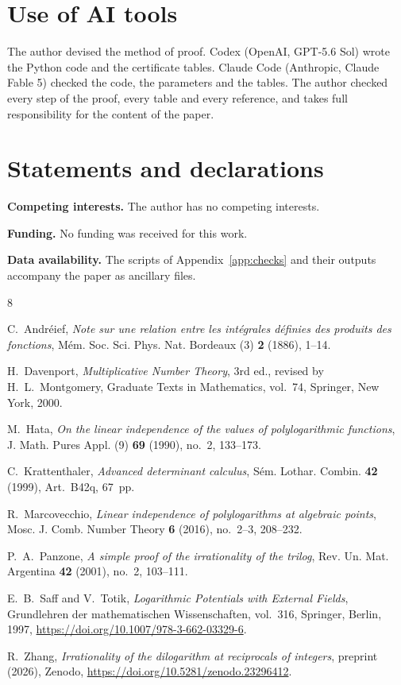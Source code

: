 \documentclass{amsart}
\numberwithin{equation}{section}
\numberwithin{table}{section}
\begin{document}
\section*{Use of AI tools}

The author devised the method of proof. Codex (OpenAI, GPT-5.6 Sol) wrote
the Python code and the certificate tables. Claude Code (Anthropic, Claude
Fable 5) checked the code, the parameters and the tables. The author checked
every step of the proof, every table and every reference, and takes full
responsibility for the content of the paper.

\section*{Statements and declarations}

\textbf{Competing interests.} The author has no competing interests.

\textbf{Funding.} No funding was received for this work.

\textbf{Data availability.} The scripts of Appendix~\ref{app:checks} and their
outputs accompany the paper as ancillary files.

\begin{thebibliography}{8}

C.~Andr\'eief, \emph{Note sur une relation entre les int\'egrales d\'efinies
des produits des fonctions}, M\'em. Soc. Sci. Phys. Nat. Bordeaux (3)
\textbf{2} (1886), 1--14.

H.~Davenport, \emph{Multiplicative Number Theory}, 3rd ed., revised by
H.~L.~Montgomery, Graduate Texts in Mathematics, vol.~74, Springer, New
York, 2000.

M.~Hata, \emph{On the linear independence of the values of polylogarithmic
functions}, J. Math. Pures Appl. (9) \textbf{69} (1990), no.~2, 133--173.

C.~Krattenthaler, \emph{Advanced determinant calculus}, S\'em. Lothar.
Combin. \textbf{42} (1999), Art.~B42q, 67~pp.

R.~Marcovecchio, \emph{Linear independence of polylogarithms at algebraic
points}, Mosc. J. Comb. Number Theory \textbf{6} (2016), no.~2--3, 208--232.

P.~A.~Panzone, \emph{A simple proof of the irrationality of the trilog},
Rev. Un. Mat. Argentina \textbf{42} (2001), no.~2, 103--111.

E.~B.~Saff and V.~Totik, \emph{Logarithmic Potentials with External Fields},
Grundlehren der mathematischen Wissenschaften, vol.~316, Springer, Berlin,
1997, \url{https://doi.org/10.1007/978-3-662-03329-6}.

R.~Zhang, \emph{Irrationality of the dilogarithm at reciprocals of
integers}, preprint (2026), Zenodo,
\url{https://doi.org/10.5281/zenodo.23296412}.

\end{thebibliography}
\end{document}

